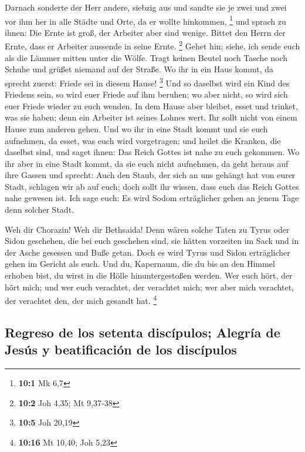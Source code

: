  Darnach sonderte der Herr andere, siebzig aus und sandte
sie je zwei und zwei vor ihm her in alle Städte und Orte, da er wollte
hinkommen, \footnote{\textbf{10:1} Mk 6,7}  und sprach zu
ihnen: Die Ernte ist groß, der Arbeiter aber sind wenige. Bittet den
Herrn der Ernte, dass er Arbeiter aussende in seine Ernte. \footnote{\textbf{10:2}
  Joh 4,35; Mt 9,37-38}  Gehet hin; siehe, ich sende euch
als die Lämmer mitten unter die Wölfe.  Tragt keinen
Beutel noch Tasche noch Schuhe und grüßet niemand auf der Straße.
 Wo ihr in ein Haus kommt, da sprecht zuerst: Friede sei
in diesem Hause! \footnote{\textbf{10:5} Joh 20,19}  Und
so daselbst wird ein Kind des Friedens sein, so wird euer Friede auf ihm
beruhen; wo aber nicht, so wird sich euer Friede wieder zu euch wenden.
 In dem Hause aber bleibet, esset und trinket, was sie
haben; denn ein Arbeiter ist seines Lohnes wert. Ihr sollt nicht von
einem Hause zum anderen gehen.  Und wo ihr in eine Stadt
kommt und sie euch aufnehmen, da esset, was euch wird vorgetragen;
 und heilet die Kranken, die daselbst sind, und saget
ihnen: Das Reich Gottes ist nahe zu euch gekommen.  Wo
ihr aber in eine Stadt kommt, da sie euch nicht aufnehmen, da geht
heraus auf ihre Gassen und sprecht:  Auch den Staub, der
sich an uns gehängt hat von eurer Stadt, schlagen wir ab auf euch; doch
sollt ihr wissen, dass euch das Reich Gottes nahe gewesen ist.
 Ich sage euch: Es wird Sodom erträglicher gehen an jenem
Tage denn solcher Stadt.

 Weh dir Chorazin! Weh dir Bethsaida! Denn wären solche
Taten zu Tyrus oder Sidon geschehen, die bei euch geschehen sind, sie
hätten vorzeiten im Sack und in der Asche gesessen und Buße getan.
 Doch es wird Tyrus und Sidon erträglicher gehen im
Gericht als euch.  Und du, Kapernaum, die du bis an den
Himmel erhoben bist, du wirst in die Hölle hinuntergestoßen werden.
 Wer euch hört, der hört mich; und wer euch verachtet,
der verachtet mich; wer aber mich verachtet, der verachtet den, der mich
gesandt hat. \footnote{\textbf{10:16} Mt 10,40; Joh 5,23}

\hypertarget{regreso-de-los-setenta-discuxedpulos-alegruxeda-de-jesuxfas-y-beatificaciuxf3n-de-los-discuxedpulos}{%
\subsection{Regreso de los setenta discípulos; Alegría de Jesús y
beatificación de los
discípulos}\label{regreso-de-los-setenta-discuxedpulos-alegruxeda-de-jesuxfas-y-beatificaciuxf3n-de-los-discuxedpulos}}

